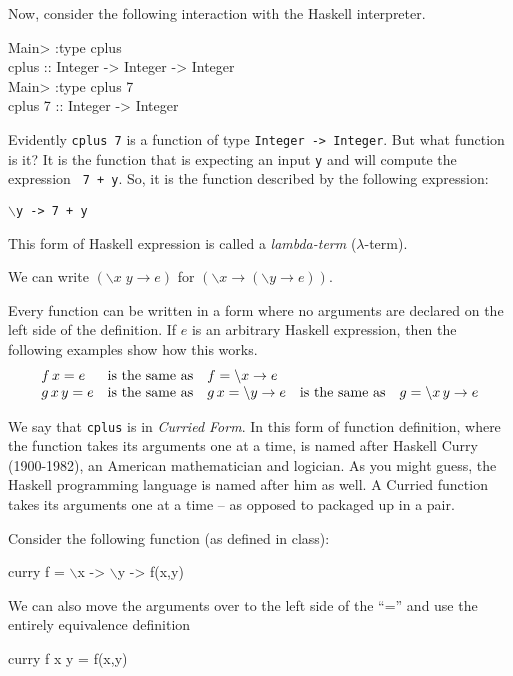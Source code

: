 \documentclass[11pt]{article}
\begin{document}
Now, consider the following interaction with the Haskell interpreter.
\begin{program*}
  \> Main> :type cplus    \\
  \> cplus :: Integer -> Integer -> Integer    \\
  \> Main> :type cplus 7    \\
  \> cplus 7 :: Integer -> Integer    \\
\end{program*}
Evidently {\tt{cplus 7}} is a function of type {\tt{Integer -> Integer}}.  But
what function is it?  It is the function that is expecting an input {\tt{y}}
and will compute the expression {\tt{ 7 + y}}.  So, it is the function
described by the following expression:\\ \begin{center}{\tt{$\backslash$y -> 7
+ y}} \end{center} This form of Haskell expression is called a
{\em{lambda-term}} ($\lambda$-term).

We can write $(\backslash x \; y \rightarrow e)$  for  $(\backslash x \rightarrow (\backslash y \rightarrow e))$.

Every function can be written in a form where no arguments are declared on the
left side of the definition.  If $e$ is an arbitrary Haskell expression, then
the following examples show how this works.
\[\begin{array}{lclcl}
f\, x = e & {\rm{is\ the\ same\ as }} & f = \backslash{}x \rightarrow e \\
g \, x \, y = e & {\rm{is\ the\ same\ as }} & g \, x = \backslash{}y \rightarrow e & {\rm{is\ the\ same\ as }} & g = \backslash{}x\, y \rightarrow e \\
\end{array}\]


We say that {\tt{cplus}} is in {\em{Curried Form}}.  In this form of function
definition, where the function takes its arguments one at a time, is named
after Haskell Curry (1900-1982), an American mathematician and logician.  As
you might guess, the Haskell programming language is named after him as well.
A Curried function  takes its arguments one at a time -- as opposed to packaged up in a pair.


Consider the following function (as defined in class):
\begin{program*}
  \> curry f  =  $\backslash$x -> $\backslash$y -> f(x,y)
\end{program*}


We can also move the arguments over to the left side of the ``='' and use the
entirely equivalence definition
\begin{program*}
  \> curry f x y  = f(x,y)
\end{program*}
\end{document}
